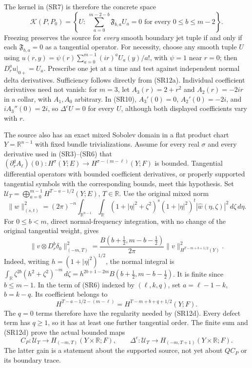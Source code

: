 \documentclass[
  11pt,
]{article}
\begin{document}
The kernel in (SR7) is therefore the concrete space \[
\mathcal K(P,P_0)=
\left\{U:\ \sum_{a=0}^{m-2-b}\mathfrak F_{b,a}U_a=0
 \text{ for every }0\leq b\leq m-2\right\}.
\tag{SR12b}
\] Freezing preserves the source for \emph{every} smooth boundary jet
tuple if and only if each \(\mathfrak F_{b,a}=0\) as a tangential
operator. For necessity, choose any smooth tuple \(U\) using
\(u(r,y)=\psi(r)\sum_{a=0}^{m-1}(ir)^aU_a(y)/a!\), with \(\psi=1\) near
\(r=0\); then \(D_r^a u|_{0+}=U_a\). Prescribe one jet at a time and
test against independent normal delta derivatives. Sufficiency follows
directly from (SR12a). Individual coefficient derivatives need not
vanish: for \(m=3\), let \(A_3(r)=2+r^2\) and \(A_2(r)=-2ir\) in a
collar, with \(A_1,A_0\) arbitrary. In (SR10), \(A_3'(0)=0\),
\(A_2'(0)=-2i\), and \(iA_3''(0)=2i\), so \(\Delta^cU=0\) for every
\(U\), although both displayed coefficients vary with \(r\).

The source also has an exact mixed Sobolev domain in a flat product
chart \(Y=\mathbb R^{n-1}\) with fixed bundle trivializations. Assume
for every real \(\sigma\) and every derivative used in (SR3)--(SR6) that
\((\partial_r^qA_\ell)(0):H^\sigma(Y;E)
\to H^{\sigma-(m-\ell)}(Y;F)\) is bounded. Tangential differential
operators with bounded coefficient derivatives, or properly supported
tangential symbols with the corresponding bounds, meet this hypothesis.
Set \(\mathcal U_T=\bigoplus_{a=0}^{m-1}
H^{T-a-1/2}(Y;E)\), \(T\in\mathbb R\). Use the original mixed norm \[
\|w\|_{(s,t)}^2=(2\pi)^{-n}
\int_{\mathbb R^{n-1}}\int_{\mathbb R}
(1+|\eta|^2+\zeta^2)^s(1+|\eta|^2)^t
|\widehat w(\eta,\zeta)|^2\,d\zeta\,d\eta.
\tag{SR12c}
\] For \(0\leq b<m\), direct normal-frequency integration, with no
change of the original tangential weight, gives \[
\|v\otimes D_r^b\delta_0\|_{(-m,T)}^2
=\frac{B(b+\tfrac12,m-b-\tfrac12)}{2\pi}
\|v\|_{H^{T-m+b+1/2}(Y)}^2.
\tag{SR12d}
\] Indeed, writing \(h=(1+|\eta|^2)^{1/2}\), the normal integral is
\(\int_{\mathbb R}\zeta^{2b}(h^2+\zeta^2)^{-m}\,d\zeta
=h^{2b+1-2m}B(b+\tfrac12,m-b-\tfrac12)\). It is finite since
\(b\leq m-1\). In the term of (SR6) indexed by \((\ell,k,q)\), set
\(a=\ell-1-k\), \(b=k-q\). Its coefficient belongs to \[
H^{T-a-1/2-(m-\ell)}
=H^{T-m+b+q+1/2}(Y;F).
\tag{SR12e}
\] The \(q=0\) terms therefore have the regularity needed by (SR12d).
Every defect term has \(q\geq1\), so it has at least one further
tangential order. The finite sum and (SR12d) prove the actual bounded
maps \[
C_P:\mathcal U_T\longrightarrow H_{(-m,T)}(Y\times\mathbb R;F),
\qquad
\Delta^c:\mathcal U_T\longrightarrow
H_{(-m,T+1)}(Y\times\mathbb R;F).
\tag{SR12f}
\] The latter gain is a statement about the supported source, not yet
about \(Q C_P\) or its boundary trace.
\end{document}
